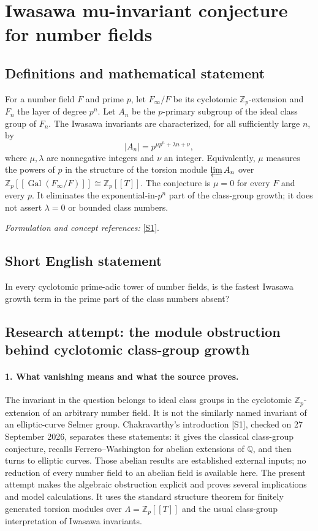 \documentclass[11pt]{article}
\begin{document}
\section*{\texorpdfstring{Iwasawa mu-invariant conjecture for number fields}{Iwasawa mu-invariant conjecture for number fields}}\label{9400180}
\subsection{Definitions and mathematical statement}
For a number field $F$ and prime $p$, let $F_\infty/F$ be its cyclotomic ${\mathbb{Z}}_p$-extension and $F_n$ the layer of degree $p^n$. Let $A_n$ be the $p$-primary subgroup of the ideal class group of $F_n$. The Iwasawa invariants are characterized, for all sufficiently large $n$, by
\[
 |A_n|=p^{\mu p^n+\lambda n+\nu},
\]
where $\mu,\lambda$ are nonnegative integers and $\nu$ an integer. Equivalently, $\mu$ measures the powers of $p$ in the structure of the torsion module $\varprojlim A_n$ over ${\mathbb{Z}}_p[[\operatorname{Gal}(F_\infty/F)]]\cong{\mathbb{Z}}_p[[T]]$. The conjecture is $\mu=0$ for every $F$ and every $p$. It eliminates the exponential-in-$p^n$ part of the class-group growth; it does not assert $\lambda=0$ or bounded class numbers.
\par\smallskip\textit{Formulation and concept references:} \href{https://arxiv.org/html/2408.07826v2}{[S1]}.

\subsection{Short English statement}
In every cyclotomic prime-adic tower of number fields, is the fastest Iwasawa growth term in the prime part of the class numbers absent?
\subsection{Research attempt: the module obstruction behind cyclotomic class-group growth}
\paragraph{1. What vanishing means and what the source proves.}
The invariant in the question belongs to ideal class groups in the cyclotomic $\mathbb Z_p$-extension of an arbitrary number field. It is not the similarly named invariant of an elliptic-curve Selmer group. Chakravarthy's introduction [S1], checked on 27 September 2026, separates these statements: it gives the classical class-group conjecture, recalls Ferrero--Washington for abelian extensions of $\mathbb Q$, and then turns to elliptic curves. Those abelian results are established external inputs; no reduction of every number field to an abelian field is available here. The present attempt makes the algebraic obstruction explicit and proves several implications and model calculations. It uses the standard structure theorem for finitely generated torsion modules over $\Lambda=\mathbb Z_p[[T]]$ and the usual class-group interpretation of Iwasawa invariants.
\end{document}
